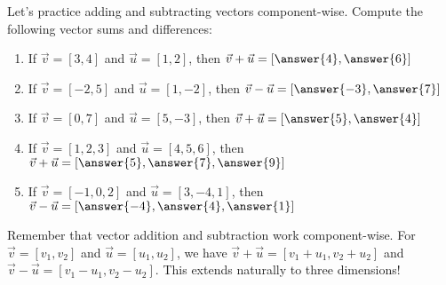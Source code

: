 \documentclass{ximera}
\begin{document}
\begin{problem}
    Let's practice adding and subtracting vectors component-wise. Compute the following vector sums and differences:
    \begin{enumerate}
        \item If $\vec{v}=[3,4]$ and $\vec{u}=[1,2]$, then $\vec{v}+\vec{u}=[\answer{4},\answer{6}]$
        \item If $\vec{v}=[-2,5]$ and $\vec{u}=[1,-2]$, then $\vec{v}-\vec{u}=[\answer{-3},\answer{7}]$
        \item If $\vec{v}=[0,7]$ and $\vec{u}=[5,-3]$, then $\vec{v}+\vec{u}=[\answer{5},\answer{4}]$
        \item If $\vec{v}=[1,2,3]$ and $\vec{u}=[4,5,6]$, then $\vec{v}+\vec{u}=[\answer{5},\answer{7},\answer{9}]$
        \item If $\vec{v}=[-1,0,2]$ and $\vec{u}=[3,-4,1]$, then $\vec{v}-\vec{u}=[\answer{-4},\answer{4},\answer{1}]$
    \end{enumerate}

    \begin{feedback}
        Remember that vector addition and subtraction work component-wise. For $\vec{v}=[v_1,v_2]$ and $\vec{u}=[u_1,u_2]$, we have $\vec{v}+\vec{u}=[v_1+u_1,v_2+u_2]$ and $\vec{v}-\vec{u}=[v_1-u_1,v_2-u_2]$. This extends naturally to three dimensions!
    \end{feedback}
\end{problem}
\end{document}
